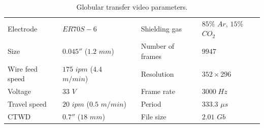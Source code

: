 \begin{table}
\centering
\caption[Globular transfer video parameters]{Globular transfer video parameters.}
\label{table:glob_params}
\begin{tabular}{|l|l|lll}
\cline{1-2} \cline{4-5}
Electrode       & $ER70S-6$             & \multicolumn{1}{l|}{} & \multicolumn{1}{l|}{Shielding gas}     & \multicolumn{1}{l|}{$85\%$ $Ar$, $15\%$ $CO_2$} \\ \cline{1-2} \cline{4-5} 
Size            & $0.045''$ ($1.2$ $mm$)     & \multicolumn{1}{l|}{} & \multicolumn{1}{l|}{Number of frames}  & \multicolumn{1}{l|}{$9947$}              \\ \cline{1-2} \cline{4-5} 
Wire feed speed & $175$ $ipm$ ($4.4$ $m/min$) & \multicolumn{1}{l|}{} & \multicolumn{1}{l|}{Resolution}        & \multicolumn{1}{l|}{$352 \times 296$}           \\ \cline{1-2} \cline{4-5} 
Voltage         & $33$ $V$                 & \multicolumn{1}{l|}{} & \multicolumn{1}{l|}{Frame rate} & \multicolumn{1}{l|}{$3000\;Hz$}              \\ \cline{1-2} \cline{4-5} 
Travel speed    & $20$ $ipm$ ($0.5$ $m/min$)  & \multicolumn{1}{l|}{} & \multicolumn{1}{l|}{Period}            & \multicolumn{1}{l|}{$333.3$ $\mu s$}           \\ \cline{1-2} \cline{4-5} 
CTWD & $0.7''$ ($18$ $mm$) &\multicolumn{1}{l|}{} & \multicolumn{1}{l|}{File size}            & \multicolumn{1}{l|}{$2.01$ $Gb$}  \\ \cline{1-2}\cline{4-5} 
\end{tabular}
\end{table}

